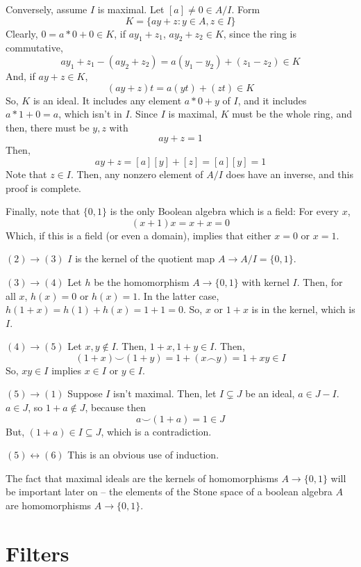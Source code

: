 \documentclass{article}
\begin{document}
      Conversely, assume $I$ is maximal. Let $[a] \neq 0 \in A/I$. Form
      \[K = \{ay + z: y \in A, z \in I\} \]
      Clearly, $0 = a*0 + 0 \in K$, if $ay_1 + z_1$, $ay_2 + z_2 \in K$, since
      the ring is commutative,
      \[ay_1 + z_1 -(ay_2 + z_2) = a(y_1-y_2) + (z_1 - z_2) \in K\]
      And, if $ay + z \in K$,
      \[(ay + z)t = a(yt) + (zt) \in K\]
      So, $K$ is an ideal. It includes any element $a*0 + y$ of $I$, and it
      includes $a*1 + 0 = a$, which isn't in $I$. Since $I$ is maximal, $K$ must
      be the whole ring, and then, there must be $y, z$ with
      \[ay + z = 1\]
      Then,
      \[ay + z= [a][y] + [z] = [a][y] = 1\]
      Note that $z \in I$. Then, any nonzero element of $A/I$ does have an
      inverse, and this proof is complete.

      Finally, note that $\{0,1\}$ is the only Boolean algebra which is a field:
      For every $x$,
      \[(x+1)x = x + x = 0\]
      Which, if this is a field (or even a domain), implies that
      either $x=0$ or $x=1$.

      $(2) \rightarrow (3)$ $I$ is the kernel of the quotient map $A \rightarrow
      A/I = \{0,1\}$.

      $(3) \rightarrow (4)$ Let $h$ be the homomorphism $A \rightarrow \{0,1\}$
      with kernel $I$. Then, for all $x$, $h(x) = 0$ or $h(x) = 1$. In the
      latter case, $h(1+x) = h(1) + h(x) = 1 + 1 = 0$. So, $x$ or $1+x$ is in
      the kernel, which is $I$.

      $(4) \rightarrow (5)$ Let $x, y \notin I$. Then, $1+x, 1+y \in I$. Then,
      \[(1+x) \smile (1+y) = 1 + (x \frown y) = 1 + xy \in I\]
      So, $xy \in I$ implies $x \in I$ or $y \in I$.

      $(5) \rightarrow (1)$ Suppose $I$ isn't maximal. Then, let $I \subsetneq
      J$ be an ideal, $a \in J - I$. $a \in J$, so $1+a \notin J$, because then
      \[a \smile (1+a) = 1 \in J\]
      But, $(1+a) \in I \subseteq J$, which is a contradiction.

      $(5) \leftrightarrow (6)$ This is an obvious use of induction.

      The fact that maximal ideals are the kernels of homomorphisms $A
      \rightarrow\{0,1\}$ will be important later on -- the elements of the
      Stone space of a boolean algebra $A$ are homomorphisms $A \to \{0,1\}$.

    \section{Filters}
\end{document}
